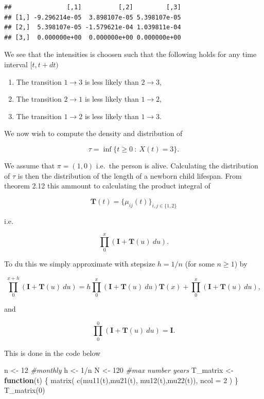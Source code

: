 \documentclass[a4paper,10pt,openany]{book}
\newenvironment{Shaded}{\begin{snugshade}}{\end{snugshade}}
\newcommand{\AttributeTok}[1]{\textcolor[rgb]{0.77,0.63,0.00}{#1}}
\newcommand{\CommentTok}[1]{\textcolor[rgb]{0.56,0.35,0.01}{\textit{#1}}}
\newcommand{\ControlFlowTok}[1]{\textcolor[rgb]{0.13,0.29,0.53}{\textbf{#1}}}
\newcommand{\DecValTok}[1]{\textcolor[rgb]{0.00,0.00,0.81}{#1}}
\newcommand{\FunctionTok}[1]{\textcolor[rgb]{0.00,0.00,0.00}{#1}}
\newcommand{\NormalTok}[1]{#1}
\newcommand{\OtherTok}[1]{\textcolor[rgb]{0.56,0.35,0.01}{#1}}
\newcommand{\SpecialCharTok}[1]{\textcolor[rgb]{0.00,0.00,0.00}{#1}}
\providecommand{\tightlist}{%
 \setlength{\itemsep}{0pt}\setlength{\parskip}{0pt}}
\begin{document}
\begin{verbatim}
##               [,1]          [,2]         [,3]
## [1,] -9.296214e-05  3.898107e-05 5.398107e-05
## [2,]  5.398107e-05 -1.579621e-04 1.039811e-04
## [3,]  0.000000e+00  0.000000e+00 0.000000e+00
\end{verbatim}

We see that the intensities is choosen such that the following holds for any time interval \([t,t+dt)\)

\begin{enumerate}
\def\labelenumi{\arabic{enumi}.}
\tightlist
\item
  The transition \(1\to 3\) is less likely than \(2\to 3\),
\item
  The transition \(2\to 1\) is less likely than \(1\to 2\),
\item
  The transition \(1\to 2\) is less likely than \(1\to 3\).
\end{enumerate}

We now wish to compute the density and distribution of

\[
\tau =\inf\{t\ge 0\ :\ X(t)=3\}.
\]

We assume that \(\pi=(1,0)\) i.e.~the person is alive. Calculating the distribution of \(\tau\) is then the distribution of the length of a newborn child lifespan. From theorem 2.12 this ammount to calculating the product integral of

\[
\mathbf{T}(t)=\{\mu_{ij}(t)\}_{i,j\in \{1,2\}}
\]

i.e.~

\[
\prod_0^x(\mathbf{I}+\mathbf{T}(u)\ du).
\]

To du this we simply approximate with stepsize \(h=1/n\) (for some \(n\ge 1\)) by

\[
\prod_0^{x+h}(\mathbf{I}+\mathbf{T}(u)\ du)=h\prod_0^x(\mathbf{I}+\mathbf{T}(u)\ du)\mathbf{T}(x)+\prod_0^x(\mathbf{I}+\mathbf{T}(u)\ du),
\]

and

\[
\prod_0^0(\mathbf{I}+\mathbf{T}(u)\ du)=\mathbf{I}.
\]

This is done in the code below

\begin{Shaded}
\begin{Highlighting}[]
\NormalTok{n }\OtherTok{\textless{}{-}} \DecValTok{12} \CommentTok{\#monthly}
\NormalTok{h }\OtherTok{\textless{}{-}} \DecValTok{1}\SpecialCharTok{/}\NormalTok{n}
\NormalTok{N }\OtherTok{\textless{}{-}} \DecValTok{120} \CommentTok{\#max number years}
\NormalTok{T\_matrix }\OtherTok{\textless{}{-}} \ControlFlowTok{function}\NormalTok{(t) \{}
  \FunctionTok{matrix}\NormalTok{(}
    \FunctionTok{c}\NormalTok{(}\FunctionTok{mu11}\NormalTok{(t),}\FunctionTok{mu21}\NormalTok{(t),}
      \FunctionTok{mu12}\NormalTok{(t),}\FunctionTok{mu22}\NormalTok{(t)),}
    \AttributeTok{ncol =} \DecValTok{2}
\NormalTok{  )}
\NormalTok{\}}
\FunctionTok{T\_matrix}\NormalTok{(}\DecValTok{0}\NormalTok{)}
\end{Highlighting}
\end{Shaded}
\end{document}
